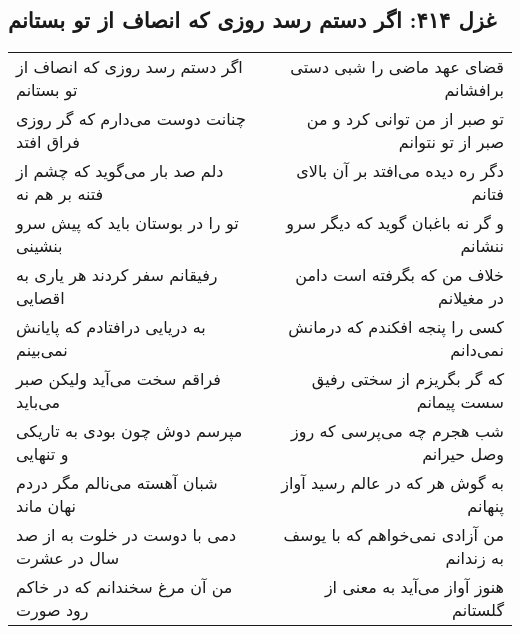 \begin{center}
\section*{غزل ۴۱۴: اگر دستم رسد روزی که انصاف از تو بستانم}
\label{sec:414}
\begin{longtable}{l p{0.5cm} r}
اگر دستم رسد روزی که انصاف از تو بستانم
&&
قضای عهد ماضی را شبی دستی برافشانم
\\
چنانت دوست می‌دارم که گر روزی فراق افتد
&&
تو صبر از من توانی کرد و من صبر از تو نتوانم
\\
دلم صد بار می‌گوید که چشم از فتنه بر هم نه
&&
دگر ره دیده می‌افتد بر آن بالای فتانم
\\
تو را در بوستان باید که پیش سرو بنشینی
&&
و گر نه باغبان گوید که دیگر سرو ننشانم
\\
رفیقانم سفر کردند هر یاری به اقصایی
&&
خلاف من که بگرفته است دامن در مغیلانم
\\
به دریایی درافتادم که پایانش نمی‌بینم
&&
کسی را پنجه افکندم که درمانش نمی‌دانم
\\
فراقم سخت می‌آید ولیکن صبر می‌باید
&&
که گر بگریزم از سختی رفیق سست پیمانم
\\
مپرسم دوش چون بودی به تاریکی و تنهایی
&&
شب هجرم چه می‌پرسی که روز وصل حیرانم
\\
شبان آهسته می‌نالم مگر دردم نهان ماند
&&
به گوش هر که در عالم رسید آواز پنهانم
\\
دمی با دوست در خلوت به از صد سال در عشرت
&&
من آزادی نمی‌خواهم که با یوسف به زندانم
\\
من آن مرغ سخندانم که در خاکم رود صورت
&&
هنوز آواز می‌آید به معنی از گلستانم
\\
\end{longtable}
\end{center}
